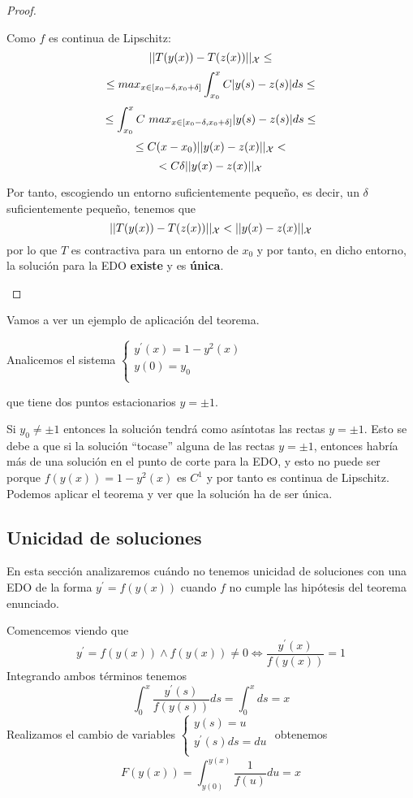 \begin{proof}
\begin{enumerate}
Como $f$ es continua de Lipschitz:
$$||T(y(x)) - T(z(x))||_\mathcal{X} \leq $$
$$\leq max_{x\in [x_0-\delta, x_0+\delta]} \int_{x_0}^x C|y(s) - z(s)|ds \leq$$
$$\leq \int_{x_0}^x C\ max_{x\in [x_0-\delta, x_0+\delta]}\abs{y(s) - z(s)}ds \leq$$
$$\leq C(x-x_0)||y(x) - z(x)||_\mathcal{X} < $$
$$< C\delta ||y(x) - z(x)||_\mathcal{X}$$

Por tanto, escogiendo un entorno suficientemente pequeño, es decir, un $\delta$ suficientemente pequeño, tenemos que 
$$||T(y(x)) - T(z(x))||_\mathcal{X} < ||y(x) - z(x)||_\mathcal{X}$$
por lo que $T$ es contractiva para un entorno de $x_0$ y por tanto, en dicho entorno, la solución para la EDO \textbf{existe} y es \textbf{única}.
\end{enumerate}
\end{proof}

Vamos a ver un ejemplo de aplicación del teorema.

\begin{example}
Analicemos el sistema $\left\lbrace\begin{array}{l}y^\prime(x) = 1-y^2(x)\\y(0) = y_0\\\end{array}\right.$

que tiene dos puntos estacionarios $y=\pm1$.

Si $y_0\neq \pm1$ entonces la solución tendrá como asíntotas las rectas $y=\pm1$. Esto se debe a que si la solución ``tocase'' alguna de las rectas $y=\pm1$, entonces habría más de una solución en el punto de corte para la EDO, y esto no puede ser porque $f(y(x)) = 1-y^2(x)$ es $C^1$ y por tanto es continua de Lipschitz. Podemos aplicar el teorema y ver que la solución ha de ser única.
\end{example}

\subsection{Unicidad de soluciones}
En esta sección analizaremos cuándo no tenemos unicidad de soluciones con una EDO de la forma $y^\prime = f(y(x))$ cuando $f$ no cumple las hipótesis del teorema enunciado.

Comencemos viendo que $$y^\prime = f(y(x)) \wedge f(y(x))\neq 0 \iff \frac{y^\prime(x)}{f(y(x))} = 1$$
Integrando ambos términos tenemos $$\int_0^x \frac{y^\prime(s)}{f(y(s))}ds = \int_0^x ds=x$$
Realizamos el cambio de variables
$\left\lbrace
  \begin{array}{l}
     y(s) = u \\
     y^\prime(s)ds = du  \\
  \end{array}
  \right.
$ obtenemos $$F(y(x)) = \int_{y(0)}^{y(x)} \frac{1}{f(u)}du = x$$

